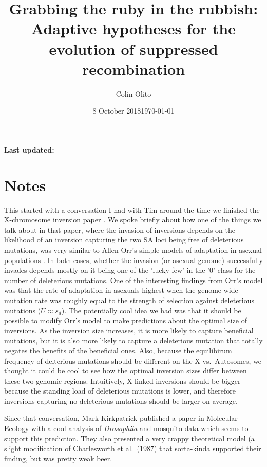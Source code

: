 \documentclass[11pt]{article}
\begin{document}
\title{Grabbing the ruby in the rubbish: Adaptive hypotheses for the evolution of suppressed recombination}
\author{Colin Olito}
\date{8 October 2018}
\maketitle

\textbf{Last updated:} \date{\today}

\section*{Notes}

This started with a conversation I had with Tim around the time we finished the X-chromosome inversion paper \citep{ConnallonOlito2018}. We spoke briefly about how one of the things we talk about in that paper, where the invasion of inversions depends on the likelihood of an inversion capturing the two SA loci being free of deleterious mutations, was very similar to Allen Orr's simple models of adaptation in asexual populations \citep{Orr2000}. In both cases, whether the invasion (or asexual genome) successfully invades depends mostly on it being one of the 'lucky few' in the '$0$' class for the number of  deleterious mutations. One of the interesting findings from Orr's model was that the rate of adaptation in asexuals highest when the genome-wide mutation rate was roughly equal to the strength of selection against deleterious mutations ($U \approx s_d$). The potentially cool idea we had was that it should be possible to modify Orr's model to make predictions about the optimal size of inversions. As the inversion size increases, it is more likely to capture beneficial mutations, but it is also more likely to capture a deleterious mutation that totally negates the benefits of the beneficial ones. Also, because the equilibirum frequency of delterious mutations should be different on the X vs.~Autosomes, we thought it could be cool to see how the optimal inversion sizes differ between these two genomic regions. Intuitively, X-linked inversions should be bigger because the standing load of deleterious mutations is lower, and therefore inversions capturing no deleterious mutations should be larger on average. 
\bigskip

Since that conversation, Mark Kirkpatrick published a paper in Molecular Ecology \citep{ChangKirkpatrick2018} with a cool analysis of \textit{Drosophila} and mosquito data which seems to support this prediction. They also presented a very crappy theoretical model (a slight modification of Charlesworth et al.~(1987) that sorta-kinda supported their finding, but was pretty weak beer.
\bigskip
\end{document}
